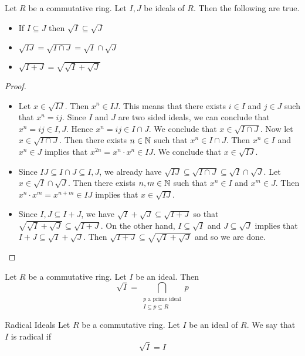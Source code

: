\documentclass[a4paper]{article}
\begin{document}
\begin{prp}{}{} Let $R$ be a commutative ring. Let $I,J$ be ideals of $R$. Then the following are true. 
\begin{itemize}
\item If $I\subseteq J$ then $\sqrt{I}\subseteq\sqrt{J}$
\item $\sqrt{IJ}=\sqrt{I\cap J}=\sqrt{I}\cap\sqrt{J}$
\item $\sqrt{I+J}=\sqrt{\sqrt{I}+\sqrt{J}}$
\end{itemize} \tcbline
\begin{proof}~\\
\begin{itemize}
\item Let $x\in\sqrt{IJ}$. Then $x^n\in IJ$. This means that there exists $i\in I$ and $j\in J$ such that $x^n=ij$. Since $I$ and $J$ are two sided ideals, we can conclude that $x^n=ij\in I,J$. Hence $x^n=ij\in I\cap J$. We conclude that $x\in\sqrt{I\cap J}$. Now let $x\in\sqrt{I\cap J}$. Then there exists $n\in\mathbb{N}$ such that $x^n\in I\cap J$. Then $x^n\in I$ and $x^n\in J$ implies that $x^{2n}=x^n\cdot x^n\in IJ$. We conclude that $x\in\sqrt{IJ}$. 
\item Since $IJ\subseteq I\cap J\subseteq I,J$, we already have $\sqrt{IJ}\subseteq\sqrt{I\cap J}\subseteq\sqrt{I}\cap\sqrt{J}$. Let $x\in\sqrt{I}\cap\sqrt{J}$. Then there exists $n,m\in\mathbb{N}$ such that $x^n\in I$ and $x^m\in J$. Then $x^n\cdot x^m=x^{n+m}\in IJ$ implies that $x\in\sqrt{IJ}$. 
\item Since $I,J\subseteq I+J$, we have $\sqrt{I}+\sqrt{J}\subseteq\sqrt{I+J}$ so that $\sqrt{\sqrt{I}+\sqrt{J}}\subseteq\sqrt{I+J}$. On the other hand, $I\subseteq\sqrt{I}$ and $J\subseteq\sqrt{J}$ implies that $I+J\subseteq\sqrt{I}+\sqrt{J}$. Then $\sqrt{I+J}\subseteq\sqrt{\sqrt{I}+\sqrt{J}}$ and so we are done. 
\end{itemize}
\end{proof}
\end{prp}

\begin{prp}{}{} Let $R$ be a commutative ring. Let $I$ be an ideal. Then $$\sqrt{I}=\bigcap_{\substack{p\text{ a prime ideal}\\I\subseteq p\subseteq R}}p$$
\end{prp}

\begin{defn}{Radical Ideals}{} Let $R$ be a commutative ring. Let $I$ be an ideal of $R$. We say that $I$ is radical if $$\sqrt{I}=I$$
\end{defn}
\end{document}
